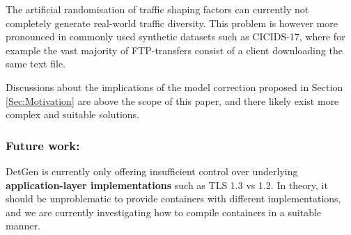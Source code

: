 \documentclass[runningheads]{llncs}
\begin{document}
The artificial randomisation of traffic shaping factors can currently not completely generate real-world traffic diversity. This problem is however more pronounced in commonly used synthetic datasets such as CICIDS-17, where for example the vast majority of FTP-transfers consist of a client downloading the same text file.

Discussions about the implications of the model correction proposed in Section \ref{Sec:Motivation} are above the scope of this paper, and there likely exist more complex and suitable solutions.

\subsubsection*{Future work:}





DetGen is currently only offering insufficient control over underlying \textbf{application-layer implementations} such as TLS 1.3 vs 1.2. In theory, it should be unproblematic to provide containers with different implementations, and we are currently investigating how to compile containers in a suitable manner.
\end{document}
